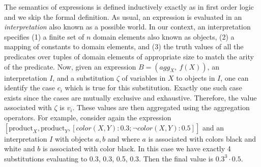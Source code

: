 The semantics of expressions is defined inductively exactly as in
first order logic and we skip the formal definition.  
As usual, an expression is evaluated in an \emph{interpretation}  also known as a possible world. 
In our context, an interpretation specifies (1) a
finite set of $n$ domain elements also known as objects, (2) a mapping
of constants to domain elements, and (3) the truth values of all the
predicates over tuples of domain elements of appropriate size to match
the arity of the predicate.
Now,
given an expression $B=(agg_X,\ f(X))$, an interpretation $I$, and a
substitution $\zeta$ of variables in $X$ to objects in $I$, one can
identify the case $c_i$ which is true for this substitution.  Exactly
one such case exists since the cases are mutually exclusive and exhaustive.
Therefore, the value associated with $\zeta$ is $v_i$.  These values
are then aggregated using the aggregation operators.  For example,
consider again the expression $[\mbox{product}_{X},
    \mbox{product}_{Y}, [color(X,Y):0.3; \neg color(X,Y):0.5]]$ and an
    interpretation $I$ with objects $a,b$ and where $a$ is associated
    with colors black and white and $b$ is associated with color
    black.  In this case we have exactly 4 substitutions evaluating to
    0.3, 0.3, 0.5, 0.3. Then the final value is $0.3^3 \cdot 0.5$.

